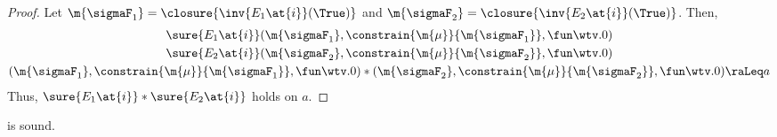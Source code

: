 \begin{proof}
  Let $\m{\sigmaF_1} = \closure{\inv{E_1\at{i}}(\True)}$
  and $\m{\sigmaF_2} = \closure{\inv{E_2\at{i}}(\True)}$.
  Then,
  \begin{gather*}
    \sure{E_1\at{i}} (\m{\sigmaF_1}, \constrain{\m{\mu}}{\m{\sigmaF_1}}, \fun \wtv. 0) \\
    \sure{E_2\at{i}} (\m{\sigmaF_2}, \constrain{\m{\mu}}{\m{\sigmaF_2}}, \fun \wtv. 0) \\
    (\m{\sigmaF_1}, \constrain{\m{\mu}}{\m{\sigmaF_1}}, \fun \wtv. 0) \ast  (\m{\sigmaF_2}, \constrain{\m{\mu}}{\m{\sigmaF_2}}, \fun \wtv. 0) \raLeq a
  \end{gather*}
  Thus, $\sure{E_1\at{i}} \ast \sure{E_2\at{i}}$ holds on $a$.
\end{proof} \begin{lemma}
\label{proof:sure-and-star}
   is sound.
\end{lemma}

